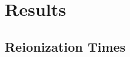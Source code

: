 \documentclass[twocolumn]{aastex61}
\begin{document}
% 
\section{Results}

%
%
%
%



\subsection{Reionization Times}
\end{document}
